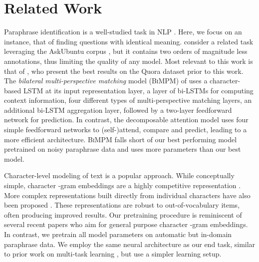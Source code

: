 \documentclass[11pt,letterpaper]{article}
\begin{document}
\section{Related Work}\label{rel-work}
Paraphrase identification is a well-studied task in NLP \cite[\textit{inter alia}]{das2009paraphrase,chang2010discriminative,he-gimpel-lin:2015:EMNLP,wang-mi-ittycheriah:2016:COLING}.  Here, we focus on an instance, that of finding questions with identical meaning.   consider a related task leveraging the AskUbuntu corpus \cite{dossantos-EtAl:2015:ACL-IJCNLP}, but it contains two orders of magnitude less annotations, thus limiting the quality of any model. Most relevant to this work is that of , who present the best results on the Quora dataset prior to this work. The \emph{bilateral multi-perspective matching} model (\textsc{BiMPM}) of \citeauthor{wang:2017:ijcai} uses a character-based LSTM \cite{hochreiter1997long} at its input representation layer, a layer of bi-LSTMs for computing context information, four different types of multi-perspective matching layers, an additional bi-LSTM aggregation layer, followed by a two-layer feedforward network for prediction.
In contrast, the decomposable attention model uses four simple feedforward networks to (self-)attend, compare and predict, leading to a more efficient architecture.
\textsc{BiMPM} falls short of our best performing model pretrained on noisy paraphrase data and uses more parameters than our best model.

Character-level modeling of text is a popular approach.
While conceptually simple, character -gram embeddings are a highly competitive representation \cite{huang-deep-structured-semantic,wieting-EtAl:2016:EMNLP2016,DBLP:journals/corr/BojanowskiGJM16}.
More complex representations built directly from individual characters have also been proposed \cite{sennrich-haddow-birch:2016:P16-12,luong-manning:2016:P16-1,Kim:2016:CNL:3016100.3016285,chung-cho-bengio:2016:P16-1,ling-EtAl:2015:EMNLP2}.
These representations are robust to out-of-vocabulary items, often producing improved results.  Our pretraining procedure is reminiscent of several recent papers \cite[\textit{inter alia}]{wieting-EtAl:2016:EMNLP2016} who aim for general purpose character -gram embeddings.  In contrast, we pretrain all model parameters on automatic but in-domain paraphrase data.  We employ the same neural architecture as our end task, similar to prior work on multi-task learning \cite[\textit{inter alia}]{sogaard-goldberg:2016:P16-2}, but use a simpler learning setup.
\end{document}
